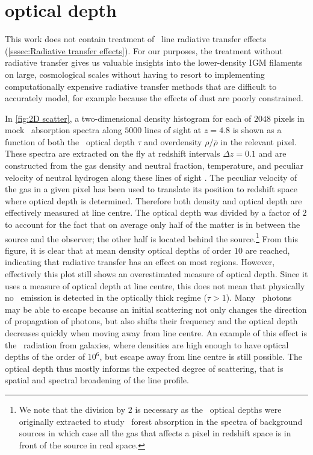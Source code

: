 \section{\texorpdfstring{\lya}{\lyatext} optical depth}
\label{ap:Lya optical depth}

This work does not contain treatment of \lya\ line radiative transfer effects (\cref{sssec:Radiative transfer effects}). For our purposes, the treatment without radiative transfer gives us valuable insights into the lower-density IGM filaments on large, cosmological scales without having to resort to implementing computationally expensive radiative transfer methods that are difficult to accurately model, for example because the effects of dust are poorly constrained.

In \cref{fig:2D scatter}, a two-dimensional density histogram for each of $2048$ pixels in mock \lya\ absorption spectra along $5000$ lines of sight at $z=4.8$ is shown as a function of both the \lya\ optical depth $\tau$ and overdensity $\rho/\bar{\rho}$ in the relevant pixel. These spectra are extracted on the fly at redshift intervals $\Delta z = 0.1$ and are constructed from the gas density and neutral fraction, temperature, and peculiar velocity of neutral hydrogen along these lines of sight \citep[for details, see][ where they are studied in the context of the \lya\ forest]{2017MNRAS.464..897B}. The peculiar velocity of the gas in a given pixel has been used to translate its position to redshift space where optical depth is determined. Therefore both density and optical depth are effectively measured at line centre. The optical depth was divided by a factor of $2$ to account for the fact that on average only half of the matter is in between the source and the observer; the other half is located behind the source.\footnote{We note that the division by $2$ is necessary as the \lya\ optical depths were originally extracted to study \lya\ forest absorption in the spectra of background sources in which case all the gas that affects a pixel in redshift space is in front of the source in real space.} From this figure, it is clear that at mean density optical depths of order $10$ are reached, indicating that radiative transfer has an effect on most regions. However, effectively this plot still shows an overestimated measure of optical depth. Since it uses a measure of optical depth at line centre, this does not mean that physically no \lya\ emission is detected in the optically thick regime ($\tau > 1$). Many \lya\ photons may be able to escape because an initial scattering not only changes the direction of propagation of photons, but also shifts their frequency and the optical depth decreases quickly when moving away from line centre. An example of this effect is the \lya\ radiation from galaxies, where densities are high enough to have optical depths of the order of $10^6$, but escape away from line centre is still possible. The optical depth thus mostly informs the expected degree of scattering, that is spatial and spectral broadening of the line profile.

